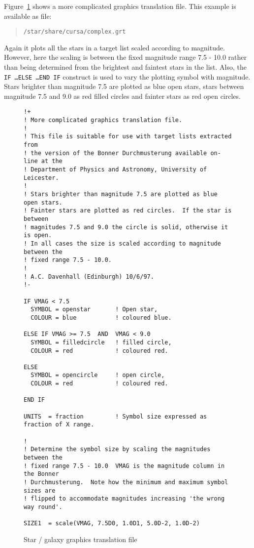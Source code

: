 \documentclass[twoside,11pt]{article}
\renewcommand{\_}{\texttt{\symbol{95}}}
\begin{document}
Figure~\ref{GRAPHTRAN2} shows a more complicated graphics translation
file.  This example is available as file:

\begin{verse}
{\tt /star/share/cursa/complex.grt}
\end{verse}

Again it plots all the stars in a target list scaled according to
magnitude.  However, here the scaling is between the fixed magnitude
range 7.5 - 10.0 rather than being determined from the brightest and
faintest stars in the list.  Also, the {\tt IF \ldots ELSE \ldots END
IF} construct is used to vary the plotting symbol with magnitude.  Stars
brighter than magnitude 7.5 are plotted as blue open stars, stars
between magnitude 7.5 and 9.0 as red filled circles and fainter stars as
red open circles.

\begin{figure}[htbp]
\begin{verbatim}
!+
! More complicated graphics translation file.
!
! This file is suitable for use with target lists extracted from
! the version of the Bonner Durchmusterung available on-line at the
! Department of Physics and Astronomy, University of Leicester.
!
! Stars brighter than magnitude 7.5 are plotted as blue open stars.
! Fainter stars are plotted as red circles.  If the star is between
! magnitudes 7.5 and 9.0 the circle is solid, otherwise it is open.
! In all cases the size is scaled according to magnitude between the
! fixed range 7.5 - 10.0.
!
! A.C. Davenhall (Edinburgh) 10/6/97.
!-

IF VMAG < 7.5
  SYMBOL = openstar       ! Open star,
  COLOUR = blue           ! coloured blue.

ELSE IF VMAG >= 7.5  AND  VMAG < 9.0
  SYMBOL = filledcircle   ! filled circle,
  COLOUR = red            ! coloured red.

ELSE
  SYMBOL = opencircle     ! open circle,
  COLOUR = red            ! coloured red.

END IF

UNITS  = fraction         ! Symbol size expressed as fraction of X range.

!
! Determine the symbol size by scaling the magnitudes between the
! fixed range 7.5 - 10.0  VMAG is the magnitude column in the Bonner
! Durchmusterung.  Note how the minimum and maximum symbol sizes are
! flipped to accommodate magnitudes increasing 'the wrong way round'.

SIZE1  = scale(VMAG, 7.5D0, 1.0D1, 5.0D-2, 1.0D-2)
\end{verbatim}

\caption{Star / galaxy graphics translation file \label{GRAPHTRAN2} }

\end{figure}
\end{document}
